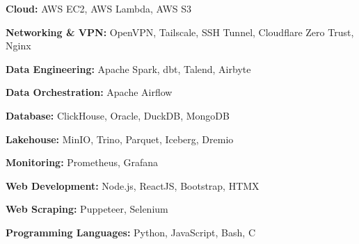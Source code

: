 \begin{onecolentry}
    \textbf{Cloud:} AWS EC2, AWS Lambda, AWS S3
\end{onecolentry}
\vspace{0.2 cm}

\begin{onecolentry}
    \textbf{Networking \& VPN:} OpenVPN, Tailscale, SSH Tunnel, Cloudflare Zero Trust, Nginx
\end{onecolentry}
\vspace{0.2 cm}

\begin{onecolentry}
    \textbf{Data Engineering:} Apache Spark, dbt, Talend, Airbyte
\end{onecolentry}
\vspace{0.2 cm}

\begin{onecolentry}
    \textbf{Data Orchestration:} Apache Airflow
\end{onecolentry}
\vspace{0.2 cm}

\begin{onecolentry}
    \textbf{Database:} ClickHouse, Oracle, DuckDB, MongoDB
\end{onecolentry}
\vspace{0.2 cm}

\begin{onecolentry}
    \textbf{Lakehouse:} MinIO, Trino, Parquet, Iceberg, Dremio
\end{onecolentry}
\vspace{0.2 cm}

\begin{onecolentry}
    \textbf{Monitoring:} Prometheus, Grafana
\end{onecolentry}
\vspace{0.2 cm}

\begin{onecolentry}
    \textbf{Web Development:} Node.js, ReactJS, Bootstrap, HTMX
\end{onecolentry}
\vspace{0.2 cm}

\begin{onecolentry}
    \textbf{Web Scraping:} Puppeteer, Selenium
\end{onecolentry}
\vspace{0.2 cm}

\begin{onecolentry}
    \textbf{Programming Languages:} Python, JavaScript, Bash, C
\end{onecolentry}
\vspace{0.2 cm}